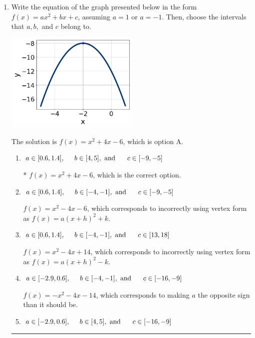 \documentclass{extbook}[14pt]
\newcommand{\litem}[1]{\item #1

\rule{\textwidth}{0.4pt}}
\begin{document}
\begin{enumerate}\litem{
Write the equation of the graph presented below in the form $f(x)=ax^2+bx+c$, assuming  $a=1$ or $a=-1$. Then, choose the intervals that $a, b,$ and $c$ belong to.

\begin{center}
    \includegraphics[width=0.5\textwidth]{../Figures/quadraticGraphToEquationCopyB.png}
\end{center}


The solution is \( f(x) = x^{2} +4 x -6 \), which is option A.\begin{enumerate}[label=\Alph*.]
\item \( a \in [0.6, 1.4], \hspace*{5mm} b \in [4, 5], \text{ and } \hspace*{5mm} c \in [-9, -5] \)

* $f(x)=x^{2} +4 x -6$, which is the correct option.
\item \( a \in [0.6, 1.4], \hspace*{5mm} b \in [-4, -1], \text{ and } \hspace*{5mm} c \in [-9, -5] \)

$f(x)=x^{2} -4 x -6$, which corresponds to incorrectly using vertex form as $f(x) = a(x+h)^2+k$.
\item \( a \in [0.6, 1.4], \hspace*{5mm} b \in [-4, -1], \text{ and } \hspace*{5mm} c \in [13, 18] \)

$f(x)=x^{2} -4 x + 14$, which corresponds to incorrectly using vertex form as $f(x) = a(x+h)^2 - k$.
\item \( a \in [-2.9, 0.6], \hspace*{5mm} b \in [-4, -1], \text{ and } \hspace*{5mm} c \in [-16, -9] \)

$f(x)=-x^{2} -4 x -14$, which corresponds to making $a$ the opposite sign than it should be.
\item \( a \in [-2.9, 0.6], \hspace*{5mm} b \in [4, 5], \text{ and } \hspace*{5mm} c \in [-16, -9] \)


\end{enumerate}}
\end{enumerate}
\end{document}
